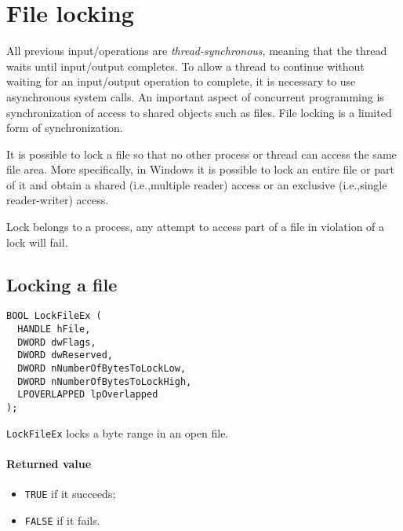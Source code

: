 \section{File locking}
All previous input/operations are \emph{thread-synchronous}, meaning that the thread waits until input/output completes. To allow a thread to continue without waiting for an input/output operation to complete, it is necessary to use asynchronous system calls. An important aspect of concurrent programming is synchronization of access to shared objects such as files. File locking is a limited form of synchronization.

It is possible to lock a file so that no other process or thread can access the same file area. More specifically, in Windows it is possible to lock an entire file or part of it and obtain a shared (i.e.,\@ multiple reader) access or an exclusive (i.e.,\@ single reader-writer) access.

Lock belongs to a process, any attempt to access part of a file in violation of a lock will fail.

\subsection{Locking a file}
\begin{verbatim}
BOOL LockFileEx (
  HANDLE hFile,
  DWORD dwFlags,
  DWORD dwReserved,
  DWORD nNumberOfBytesToLockLow,
  DWORD nNumberOfBytesToLockHigh,
  LPOVERLAPPED lpOverlapped
);
\end{verbatim}

\texttt{LockFileEx} locks a byte range in an open file.

\paragraph{Returned value}
\begin{itemize}
\item \texttt{TRUE} if it succeeds;
\item \texttt{FALSE} if it fails.
\end{itemize}

